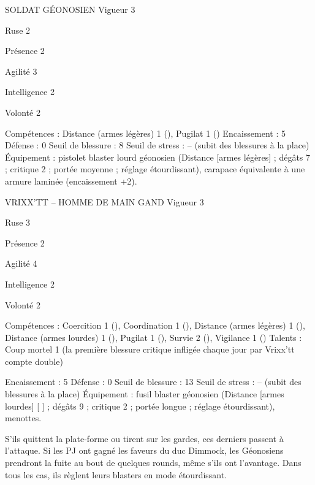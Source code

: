 \documentclass[a4paper,10pt,twoside,twocolumn,openany]{book}
\begin{document}
\begin{monsterbox}
  
SOLDAT GÉONOSIEN
Vigueur 3

Ruse 2

Présence 2

Agilité 3

Intelligence 2

Volonté 2

Compétences : Distance (armes légères) 1
(\difficulty \difficulty \proficiency), Pugilat 1 (\difficulty \difficulty \proficiency)
Encaissement : 5		Défense : 0
Seuil de blessure : 8
Seuil de stress : – (subit des blessures à la place)
Équipement : pistolet blaster lourd géonosien (Distance [armes légères] ; dégâts 7 ; critique 2 ; portée
moyenne ; réglage étourdissant), carapace équivalente à une armure laminée (encaissement +2).
\end{monsterbox}

\begin{monsterbox}
VRIXX’TT – HOMME DE MAIN GAND
Vigueur 3

Ruse 3

Présence 2

Agilité 4

Intelligence 2

Volonté 2

Compétences : Coercition 1 (\difficulty \proficiency), Coordination 1
(\difficulty \difficulty \difficulty \proficiency), Distance (armes légères) 1 (\difficulty \difficulty \difficulty \proficiency),
Distance (armes lourdes) 1 (\difficulty \difficulty \difficulty \proficiency), Pugilat 1
(\difficulty \difficulty \proficiency), Survie 2 (\difficulty \proficiency \proficiency), Vigilance 1 (\difficulty \proficiency)
Talents : Coup mortel 1 (la première blessure
critique infligée chaque jour par Vrixx’tt compte
double)

Encaissement : 5		Défense : 0
Seuil de blessure : 13
Seuil de stress : – (subit des blessures à la place)
Équipement : fusil blaster géonosien (Distance
[armes lourdes] [ \difficulty \difficulty \difficulty \proficiency ] ; dégâts 9 ; critique 2 ;
portée longue ; réglage étourdissant), menottes.

\end{monsterbox}

S’ils quittent la plate-forme ou tirent sur les gardes,
ces derniers passent à l’attaque. Si les PJ ont gagné les
faveurs du duc Dimmock, les Géonosiens prendront la
fuite au bout de quelques rounds, même s’ils ont l’avantage. Dans tous les cas, ils règlent leurs blasters en mode
étourdissant.
\end{document}
